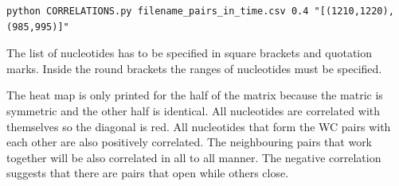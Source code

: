 \documentclass[12pt]{article}
\begin{document}
\begin{verbatim}
python CORRELATIONS.py filename_pairs_in_time.csv 0.4 "[(1210,1220),(985,995)]" 
\end{verbatim}

The list of nucleotides has to be specified in square brackets and quotation marks. Inside the round brackets the ranges of nucleotides must be specified. 

The heat map is only printed for the half of the matrix because the matric is symmetric and the other half is identical. All nucleotides are correlated with themselves so the diagonal is red. All nucleotides that form the WC pairs with each other are also positively correlated. The neighbouring pairs that work together will be also correlated in all to all manner. The negative correlation suggests that there are pairs that open while others close.
\end{document}
